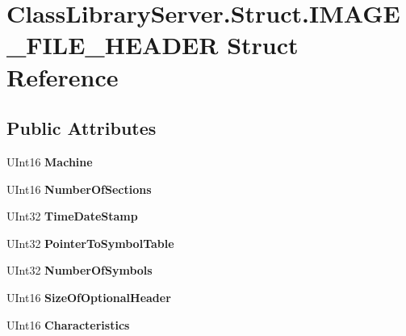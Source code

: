 \hypertarget{struct_class_library_server_1_1_struct_1_1_i_m_a_g_e___f_i_l_e___h_e_a_d_e_r}{}\section{Class\+Library\+Server.\+Struct.\+I\+M\+A\+G\+E\+\_\+\+F\+I\+L\+E\+\_\+\+H\+E\+A\+D\+ER Struct Reference}
\label{struct_class_library_server_1_1_struct_1_1_i_m_a_g_e___f_i_l_e___h_e_a_d_e_r}
\subsection*{Public Attributes}
\begin{DoxyCompactItemize}
\item 
\mbox{\label{struct_class_library_server_1_1_struct_1_1_i_m_a_g_e___f_i_l_e___h_e_a_d_e_r_aa5f813a18adfe7fb20fc92f09bfcb8d6}} 
U\+Int16 {\bfseries Machine}
\item 
\mbox{\label{struct_class_library_server_1_1_struct_1_1_i_m_a_g_e___f_i_l_e___h_e_a_d_e_r_a619506e50151a69605107aee78c03409}} 
U\+Int16 {\bfseries Number\+Of\+Sections}
\item 
\mbox{\label{struct_class_library_server_1_1_struct_1_1_i_m_a_g_e___f_i_l_e___h_e_a_d_e_r_a21b50d5e22e53caad31c36cda7a3a41d}} 
U\+Int32 {\bfseries Time\+Date\+Stamp}
\item 
\mbox{\label{struct_class_library_server_1_1_struct_1_1_i_m_a_g_e___f_i_l_e___h_e_a_d_e_r_a6cf208ef19fce49736eb6c6dc1f53fb9}} 
U\+Int32 {\bfseries Pointer\+To\+Symbol\+Table}
\item 
\mbox{\label{struct_class_library_server_1_1_struct_1_1_i_m_a_g_e___f_i_l_e___h_e_a_d_e_r_a15da069dbf8017b956bf0eec3f9b7b49}} 
U\+Int32 {\bfseries Number\+Of\+Symbols}
\item 
\mbox{\label{struct_class_library_server_1_1_struct_1_1_i_m_a_g_e___f_i_l_e___h_e_a_d_e_r_ac98815671d0d1e7369a7e0343dc66b10}} 
U\+Int16 {\bfseries Size\+Of\+Optional\+Header}
\item 
\mbox{\label{struct_class_library_server_1_1_struct_1_1_i_m_a_g_e___f_i_l_e___h_e_a_d_e_r_ae731f184ccb479e4ec772ae62e281cdb}} 
U\+Int16 {\bfseries Characteristics}
\end{DoxyCompactItemize}


